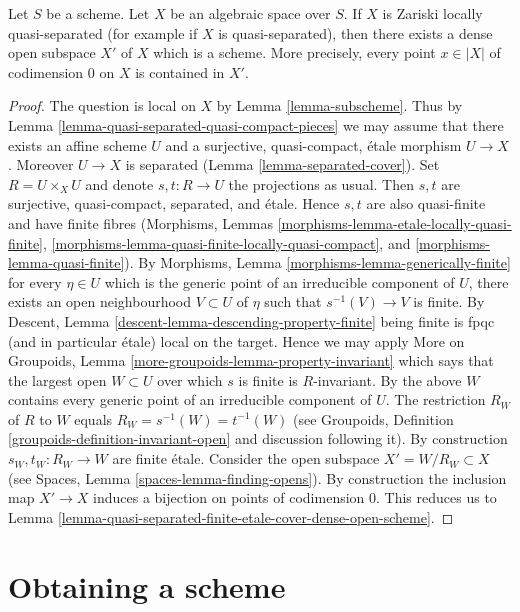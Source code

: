 \begin{proposition}
\label{proposition-locally-quasi-separated-open-dense-scheme}
Let $S$ be a scheme. Let $X$ be an algebraic space over $S$. If $X$ is
Zariski locally quasi-separated (for example if $X$ is quasi-separated), then
there exists a dense open subspace $X'$ of $X$ which is a scheme.
More precisely, every point $x \in |X|$ of codimension $0$ on $X$
is contained in $X'$.
\end{proposition}

\begin{proof}
The question is local on $X$ by Lemma \ref{lemma-subscheme}.
Thus by Lemma \ref{lemma-quasi-separated-quasi-compact-pieces}
we may assume that there exists an affine scheme $U$ and a
surjective, quasi-compact, \'etale morphism $U \to X$.
Moreover $U \to X$ is separated (Lemma \ref{lemma-separated-cover}).
Set $R = U \times_X U$ and denote $s, t : R \to U$ the projections
as usual. Then $s, t$ are surjective, quasi-compact, separated, and
\'etale. Hence $s, t$ are also quasi-finite and have finite fibres
(Morphisms,
Lemmas \ref{morphisms-lemma-etale-locally-quasi-finite},
\ref{morphisms-lemma-quasi-finite-locally-quasi-compact}, and
\ref{morphisms-lemma-quasi-finite}).
By Morphisms, Lemma \ref{morphisms-lemma-generically-finite}
for every $\eta \in U$ which is the generic point of an
irreducible component of $U$, there exists an open neighbourhood
$V \subset U$ of $\eta$ such that $s^{-1}(V) \to V$ is finite. By
Descent, Lemma \ref{descent-lemma-descending-property-finite}
being finite is fpqc (and in particular \'etale) local on the target.
Hence we may apply
More on Groupoids, Lemma \ref{more-groupoids-lemma-property-invariant}
which says that the largest open $W \subset U$ over which $s$ is
finite is $R$-invariant. By the above $W$ contains every
generic point of an irreducible component of $U$.
The restriction $R_W$ of $R$ to $W$ equals $R_W = s^{-1}(W) = t^{-1}(W)$
(see Groupoids, Definition \ref{groupoids-definition-invariant-open}
and discussion following it).
By construction $s_W, t_W : R_W \to W$ are finite \'etale.
Consider the open subspace $X' = W/R_W \subset X$ (see
Spaces, Lemma \ref{spaces-lemma-finding-opens}).
By construction the inclusion map $X' \to X$
induces a bijection on points of codimension $0$.
This reduces us to
Lemma \ref{lemma-quasi-separated-finite-etale-cover-dense-open-scheme}.
\end{proof}




\section{Obtaining a scheme}
\label{section-getting-a-scheme}

